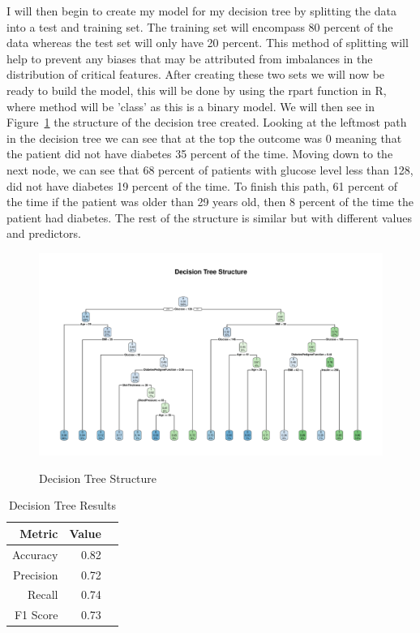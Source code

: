 \documentclass[12pt]{article}
\begin{document}
    I will then begin to create my model for my decision tree by splitting the data into a test and training set. The training set will
    encompass 80 percent of the data whereas the test set will only have 20 percent. This method of splitting will help to prevent any biases that may 
    be attributed from imbalances in the distribution of critical features. After creating these two sets we will now be ready
    to build the model, this will be done by using the rpart function in R, where method will be 'class' as this is a binary model. We will
    then see in Figure~\ref{fig:structure} the structure of the decision tree created. Looking at the leftmost path in the decision tree we 
    can see that at the top the outcome was 0 meaning that the patient did not have diabetes 35 percent of the time. Moving down to the next node, 
    we can see that 68 percent of patients with glucose level less than 128, did not have diabetes 19 percent of the time. To finish this path,
    61 percent of the time if the patient was older than 29 years old, then 8 percent of the time the patient had diabetes. The rest of the structure
    is similar but with different values and predictors.

\begin{figure}[tbp]
  \centering
  \caption{Decision Tree Structure}
  \includegraphics[width=\textwidth]{Decision Tree Structure.pdf}
  \label{fig:structure}
  \end{figure}

\begin{table}[ht]
    \centering
    \caption{Decision Tree Results}
    \label{tab:dtr} 
    \begin{tabular}{rrr}
      \toprule
      Metric & Value\\
      \midrule
      Accuracy & 0.82\\
      Precision & 0.72\\
      Recall & 0.74\\
      F1 Score & 0.73\\
      \bottomrule
      \end{tabular}
    \end{table}
\end{document}
